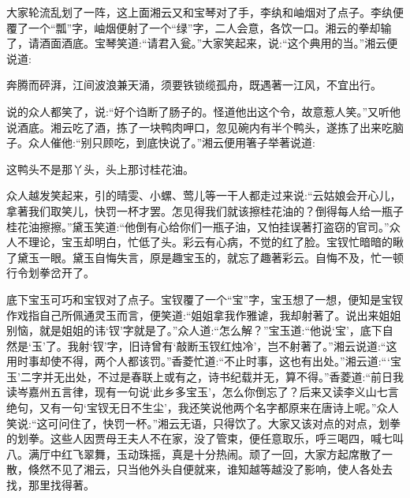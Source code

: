 \begin{parag}
    大家轮流乱划了一阵，这上面湘云又和宝琴对了手，李纨和岫烟对了点子。李纨便覆了一个“瓢”字，岫烟便射了一个“绿”字，二人会意，各饮一口。湘云的拳却输了，请酒面酒底。宝琴笑道:“请君入瓮。”大家笑起来，说:“这个典用的当。”湘云便说道:
\end{parag}


\begin{poem}
    \begin{pl}奔腾而砰湃，江间波浪兼天涌，须要铁锁缆孤舟，既遇著一江风，不宜出行。\end{pl}

\end{poem}


\begin{parag}
    说的众人都笑了，说:“好个诌断了肠子的。怪道他出这个令，故意惹人笑。”又听他说酒底。湘云吃了酒，拣了一块鸭肉呷口，忽见碗内有半个鸭头，遂拣了出来吃脑子。众人催他:“别只顾吃，到底快说了。”湘云便用箸子举著说道:
\end{parag}


\begin{poem}
    \begin{pl}这鸭头不是那丫头，头上那讨桂花油。\end{pl}
\end{poem}


\begin{parag}
    众人越发笑起来，引的晴雯、小螺、莺儿等一干人都走过来说:“云姑娘会开心儿，拿著我们取笑儿，快罚一杯才罢。怎见得我们就该擦桂花油的？倒得每人给一瓶子桂花油擦擦。”黛玉笑道:“他倒有心给你们一瓶子油，又怕挂误著打盗窃的官司。”众人不理论，宝玉却明白，忙低了头。彩云有心病，不觉的红了脸。宝钗忙暗暗的瞅了黛玉一眼。黛玉自悔失言，原是趣宝玉的，就忘了趣著彩云。自悔不及，忙一顿行令划拳岔开了。
\end{parag}


\begin{parag}
    底下宝玉可巧和宝钗对了点子。宝钗覆了一个“宝”字，宝玉想了一想，便知是宝钗作戏指自己所佩通灵玉而言，便笑道:“姐姐拿我作雅谑，我却射著了。说出来姐姐别恼，就是姐姐的讳‘钗’字就是了。”众人道:“怎么解？”宝玉道:“他说‘宝’，底下自然是‘玉’了。我射‘钗’字，旧诗曾有‘敲断玉钗红烛冷’，岂不射著了。”湘云说道:“这用时事却使不得，两个人都该罚。”香菱忙道:“不止时事，这也有出处。”湘云道:“‘宝玉’二字并无出处，不过是春联上或有之，诗书纪载并无，算不得。”香菱道:“前日我读岑嘉州五言律，现有一句说‘此乡多宝玉’，怎么你倒忘了？后来又读李义山七言绝句，又有一句‘宝钗无日不生尘’，我还笑说他两个名字都原来在唐诗上呢。”众人笑说:“这可问住了，快罚一杯。”湘云无语，只得饮了。大家又该对点的对点，划拳的划拳。这些人因贾母王夫人不在家，没了管束，便任意取乐，呼三喝四，喊七叫八。满厅中红飞翠舞，玉动珠摇，真是十分热闹。顽了一回，大家方起席散了一散，倏然不见了湘云，只当他外头自便就来，谁知越等越没了影响，使人各处去找，那里找得著。
\end{parag}


